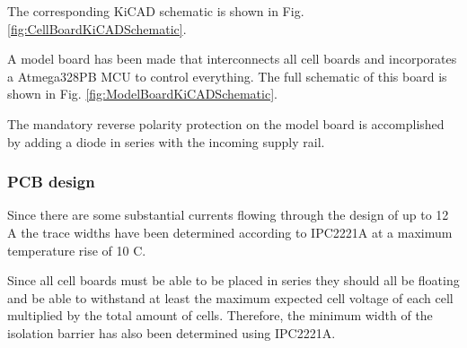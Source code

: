The corresponding KiCAD schematic is shown in Fig. \ref{fig:CellBoardKiCADSchematic}.

A model board has been made that interconnects all cell boards and incorporates a Atmega328PB MCU to control everything. The full schematic of this board is shown in Fig. \ref{fig:ModelBoardKiCADSchematic}. 

The mandatory reverse polarity protection on the model board is accomplished by adding a diode in series with the incoming supply rail.

\subsubsection{PCB design}
Since there are some substantial currents flowing through the design of up to 12 A the trace widths have been determined according to IPC2221A at a maximum temperature rise of 10 \textdegree C.

Since all cell boards must be able to be placed in series they should all be floating and be able to withstand at least the maximum expected cell voltage of each cell multiplied by the total amount of cells. Therefore, the minimum width of the isolation barrier has also been determined using IPC2221A.

